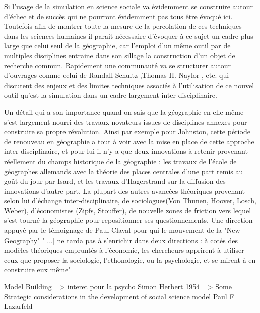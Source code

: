 Si l'usage de la simulation en science sociale va évidemment se construire autour d'échec et de succès qui ne pourront évidemment pas tous être évoqué ici. Toutefois afin de montrer toute la mesure de la percolation de ces techniques dans les sciences humaines il parait nécessaire d'évoquer à ce sujet un cadre plus large que celui seul de la géographie, car l'emploi d'un même outil par de multiples disciplines entraine dans son sillage la construction d'un objet de recherche commun. Rapidement une communauté va se structurer autour d'ouvrages comme celui de Randall Schultz \autocite{Schultz1972} ,Thomas H. Naylor \autocite{Naylor1966}, etc. qui discutent des enjeux et des limites techniques associés à l'utilisation de ce nouvel outil qu'est la simulation dans un cadre largement inter-disciplinaire. 

Un détail qui a son importance quand on sais que la géographie en elle même s'est largement nourri des travaux novateurs issues de disciplines annexes pour construire sa propre révolution.  Ainsi par exemple pour Johnston, cette période de renouveau en géographie a tout à voir avec la mise en place de cette approche inter-disciplinaire, et pour lui il n'y a que deux innovations à retenir provenant réellement du champs historique de la géographie : les travaux de l'école de géographes allemands avec la théorie des places centrales d'une part remis au goût du jour par Isard, et les travaux d'Hagerstrand sur la diffusion des innovations d'autre part. La plupart des autres avancées théoriques provenant selon lui d'échange inter-disciplinaire, de sociologues(Von Thunen, Hoover, Losch, Weber), d'économistes (Zipfs, Stouffer), de nouvelle zones de friction vers lequel s'est tourné la géographie pour repositionner ses questionnements. Une direction appuyé par le témoignage de Paul Claval pour qui le mouvement de la "New Geography" \autocite[6]{Claval1977} "[...] ne tarda pas à s'enrichir dans deux directions : à cotés des modèles théoriques empruntés à l'économie, les chercheurs apprirent à utiliser ceux que proposer la sociologie, l'ethonologie, ou la psychologie, et se mirent à en construire eux même"

Model Building => \autocite{Gullahorn1965a} interet pour la psycho
Simon Herbert 1954 =>  Some Strategic considerations in the development of social science model Paul F Lazarfeld

